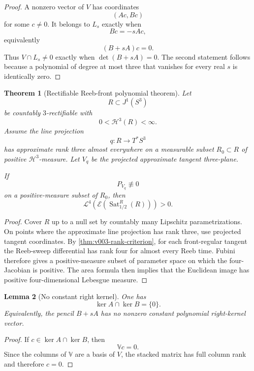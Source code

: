 \documentclass[10pt]{article}
\newtheorem{theorem}{Theorem}[section]
\newtheorem{lemma}[theorem]{Lemma}
\newcommand{\Sat}{\operatorname{Sat}}
\begin{document}
\begin{proof}
A nonzero vector of \(V\) has coordinates
\[
(Ac,Bc)
\]
for some \(c\neq0\).  It belongs to \(L_s\) exactly when
\[
Bc=-sAc,
\]
equivalently
\[
(B+sA)c=0.
\]
Thus \(V\cap L_s\neq0\) exactly when \(\det(B+sA)=0\).  The second statement follows because a
polynomial of degree at most three that vanishes for every real \(s\) is identically zero.
\end{proof}

\begin{theorem}[Rectifiable Reeb-front polynomial theorem]
\label{thm:v003-rectifiable-polynomial}
Let
\[
R\subset J^1(S^3)
\]
be countably \(3\)-rectifiable with
\[
0<\mathcal H^3(R)<\infty.
\]
Assume the line projection
\[
q:R\to T^*S^3
\]
has approximate rank three almost everywhere on a measurable subset \(R_0\subset R\) of positive
\(\mathcal H^3\)-measure.  Let \(V_q\) be the projected approximate tangent three-plane.

If
\[
P_{V_q}\not\equiv0
\]
on a positive-measure subset of \(R_0\), then
\begin{equation}
\label{eq:v003-rectifiable-positive-front}
\boxed{
\mathcal L^4
\left(
\mathcal E(\Sat_{1/2}^{R}(R))
\right)
>0.
}
\end{equation}
\end{theorem}

\begin{proof}
Cover \(R\) up to a null set by countably many Lipschitz parametrizations.  On points where the
approximate line projection has rank three, use projected tangent coordinates.  By
\cref{thm:v003-rank-criterion}, for each front-regular tangent the Reeb-sweep differential has rank
four for almost every Reeb time.  Fubini therefore gives a positive-measure subset of parameter
space on which the four-Jacobian is positive.  The area formula then implies that the Euclidean
image has positive four-dimensional Lebesgue measure.
\end{proof}

\begin{lemma}[No constant right kernel]
\label{lem:v004-no-constant-right-kernel}
One has
\begin{equation}
\label{eq:v004-no-common-right}
\boxed{
\ker A\cap\ker B=\{0\}.
}
\end{equation}
Equivalently, the pencil \(B+sA\) has no nonzero constant polynomial right-kernel vector.
\end{lemma}

\begin{proof}
If \(c\in\ker A\cap\ker B\), then
\[
\mathbb Vc=0.
\]
Since the columns of \(\mathbb V\) are a basis of \(V\), the stacked matrix has full column rank and
therefore \(c=0\).
\end{proof}
\end{document}
